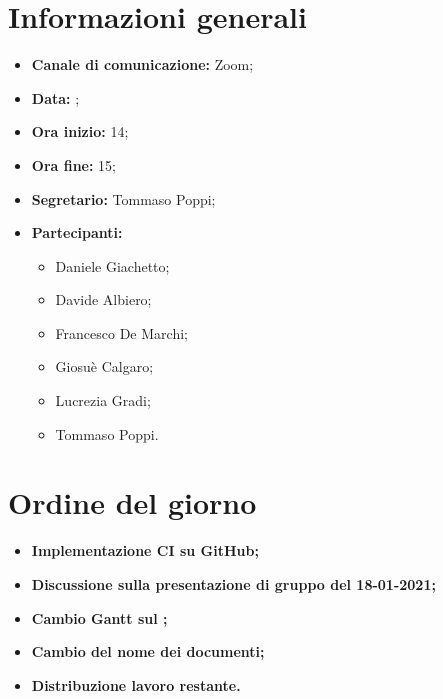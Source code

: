 \section{Informazioni generali}

\begin{itemize}

	\item \textbf{Canale di comunicazione:} Zoom;
	
	\item \textbf{Data:} \DataMeeting{};
	
	\item \textbf{Ora inizio:} 14;
	
	\item \textbf{Ora fine:} 15;
	
	\item \textbf{Segretario:} Tommaso Poppi;
	
	\item \textbf{Partecipanti:}
	
		\begin{itemize}
		
			\item Daniele Giachetto;
			\item Davide Albiero;
			\item Francesco De Marchi;
			\item Giosuè Calgaro;
			\item Lucrezia Gradi;
			\item Tommaso Poppi.
				 
		\end{itemize}

\end{itemize}



\section{Ordine del giorno}

\begin{itemize}

	\item\textbf{Implementazione CI su GitHub;}
	
	\item\textbf{Discussione sulla presentazione di gruppo del 18-01-2021;}

	\item\textbf{Cambio Gantt sul \PdP{};}

	\item\textbf{Cambio del nome dei documenti;}
	
	\item\textbf{Distribuzione lavoro restante.}

\end{itemize}

